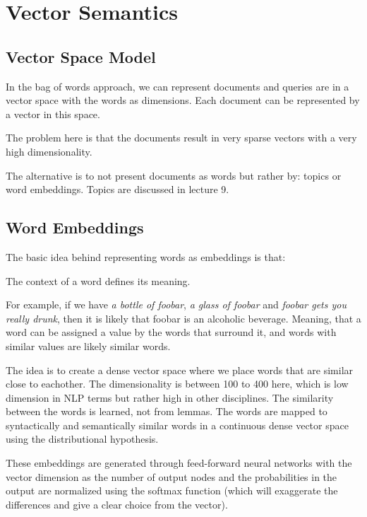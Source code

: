 \section{Vector Semantics}

\subsection{Vector Space Model}

In the bag of words approach, we can represent
documents and queries are in a vector space with
the words as dimensions. Each document can be
represented by a vector in this space.

The problem here is that the documents result in
very sparse vectors with a very high dimensionality.

The alternative is to not present documents as words
but rather by: topics or word embeddings. Topics are
discussed in lecture 9.

\subsection{Word Embeddings}

The basic idea behind representing words as
embeddings is that:

\begin{definition}
  The context of a word defines its meaning.
\end{definition}

For example, if we have \textit{a bottle of foobar},
\textit{a glass of foobar} and \textit{foobar gets you really drunk},
then it is likely that foobar is an alcoholic
beverage. Meaning, that a word can be assigned
a value by the words that surround it, and words
with similar values are likely similar words.

The idea is to create a dense vector space where we
place words that are similar close to eachother. The
dimensionality is between 100 to 400 here, which is
low dimension in NLP terms but rather high in other
disciplines. The similarity between the words is learned,
not from lemmas. The words are mapped to syntactically and semantically
similar words in a continuous dense vector space using the
distributional hypothesis.

These embeddings are generated through feed-forward neural
networks with the vector dimension as the number of output
nodes and the probabilities in the output are normalized using
the softmax function (which will exaggerate the differences
and give a clear choice from the vector).

